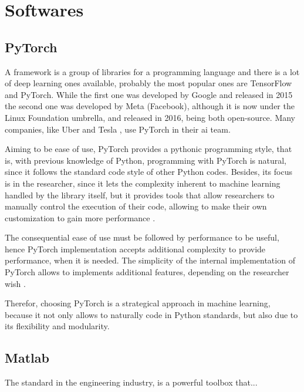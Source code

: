 \section{Softwares}

\subsection{PyTorch}

A framework is a group of libraries for a programming language and there is a lot of deep learning ones available, probably the most popular ones are TensorFlow and PyTorch. 
While the first one was developed by Google and released in 2015 the second one was developed by Meta (Facebook), although it is now under the Linux Foundation umbrella, and released in 2016, being both open-source.
Many companies, like Uber \citep{goodman2017} and Tesla \citep{pytorch2019}, use PyTorch in their \gls*{ai} team.


Aiming to be ease of use, PyTorch provides a pythonic programming style, that is, with previous knowledge of Python, programming with PyTorch is natural, since it follows the standard code style of other Python codes.
Besides, its focus is in the researcher, since it lets the complexity inherent to machine learning handled by the library itself, but it provides tools that allow researchers to manually control the execution of their code, allowing to make their own customization to gain more performance \citep{paszke2019}.

The consequential ease of use must be followed by performance to be useful, hence PyTorch implementation accepts additional complexity to provide performance, when it is needed.
The simplicity of the internal implementation of PyTorch allows to implements additional features, depending on the researcher wish \citep{paszke2019}.

Therefor, choosing PyTorch is a strategical approach in machine learning, because it not only allows to naturally code in Python standards, but also due to its flexibility and modularity.

\subsection{Matlab}

The standard in the engineering industry, \matlab is a powerful toolbox that...